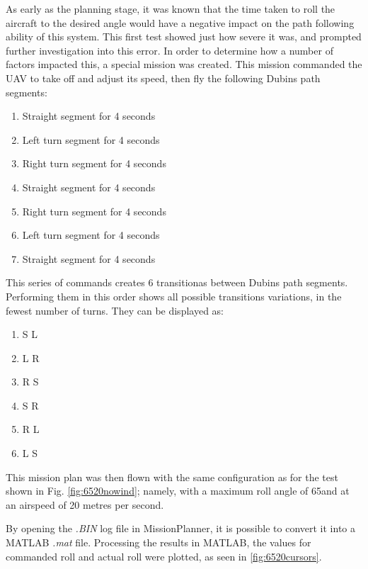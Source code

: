 As early as the planning stage, it was known that the time taken to roll the aircraft to the desired angle would have a negative impact on the path following ability of this system. This first test showed just how severe it was, and prompted further investigation into this error. In order to determine how a number of factors impacted this, a special mission was created. This mission commanded the UAV to take off and adjust its speed, then fly the following Dubins path segments:

\begin{enumerate}
	\item Straight segment for 4 seconds
	\item Left turn segment for 4 seconds
	\item Right turn segment for 4 seconds
	\item Straight segment for 4 seconds
	\item Right turn segment for 4 seconds
	\item Left turn segment for 4 seconds
	\item Straight segment for 4 seconds
\end{enumerate}

This series of commands creates 6 transitionas between Dubins path segments. Performing them in this order shows all possible transitions variations, in the fewest number of turns. They can be displayed as:

\begin{enumerate}
	\item S \textrightarrow L
	\item L \textrightarrow R
	\item R \textrightarrow S
	\item S \textrightarrow R
	\item R \textrightarrow L
	\item L \textrightarrow S
\end{enumerate}

This mission plan was then flown with the same configuration as for the test shown in Fig. \ref{fig:6520nowind}; namely, with a maximum roll angle of 65\degree and at an airspeed of 20 metres per second. 

By opening the \textit{.BIN} log file in MissionPlanner, it is possible to convert it into a MATLAB \textit{.mat} file. Processing the results in MATLAB, the values for commanded roll and actual roll were plotted, as seen in \ref{fig:6520cursors}. 

